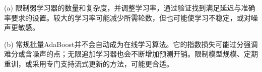 (a) 限制弱学习器的数量和复杂度，并调整学习率，通过验证找到满足延迟与准确率要求的设置。较大的学习率可能减少所需轮数，但也可能使学习不稳定，或对噪声更敏感。


(b) 常规批量AdaBoost并不会自动成为在线学习算法。它的指数损失可能过分强调难分或含噪声的点；无限追加学习器也会不断增加预测开销。限制模型规模、定期重训，或采用专门支持流式更新的方法，可能更合适。

